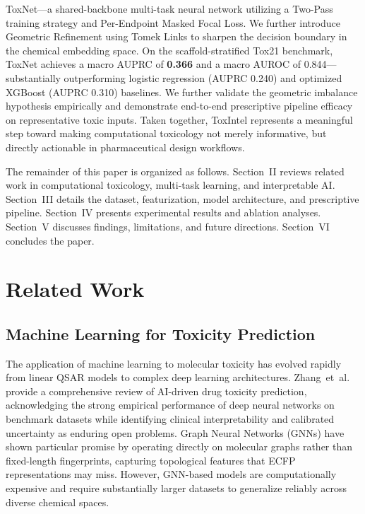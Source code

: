 \documentclass[lettersize,journal]{IEEEtran}
\begin{document}
ToxNet---a shared-backbone multi-task neural network utilizing a Two-Pass
training strategy and Per-Endpoint Masked Focal Loss.
We further introduce Geometric Refinement using Tomek Links to sharpen the
decision boundary in the chemical embedding space.
On the scaffold-stratified Tox21 benchmark, ToxNet achieves a macro AUPRC of
\textbf{0.366} and a macro AUROC of 0.844---substantially outperforming 
logistic regression (AUPRC 0.240) and optimized XGBoost (AUPRC 0.310) baselines.
We further validate the geometric imbalance hypothesis empirically and
demonstrate end-to-end prescriptive pipeline efficacy on representative toxic
inputs.
Taken together, ToxIntel represents a meaningful step toward making
computational toxicology not merely informative, but directly actionable in
pharmaceutical design workflows.

The remainder of this paper is organized as follows.
Section~II reviews related work in computational toxicology, multi-task
learning, and interpretable AI.
Section~III details the dataset, featurization, model architecture, and
prescriptive pipeline.
Section~IV presents experimental results and ablation analyses.
Section~V discusses findings, limitations, and future directions.
Section~VI concludes the paper.

\section{Related Work}

\subsection{Machine Learning for Toxicity Prediction}
The application of machine learning to molecular toxicity has evolved rapidly
from linear QSAR models to complex deep learning architectures.
Zhang~et~al.~\cite{zhang2025} provide a comprehensive review of AI-driven drug
toxicity prediction, acknowledging the strong empirical performance of deep
neural networks on benchmark datasets while identifying clinical interpretability
and calibrated uncertainty as enduring open problems.
Graph Neural Networks (GNNs) have shown particular promise by operating
directly on molecular graphs rather than fixed-length fingerprints, capturing
topological features that ECFP representations may miss.
However, GNN-based models are computationally expensive and require substantially
larger datasets to generalize reliably across diverse chemical spaces.
\end{document}
